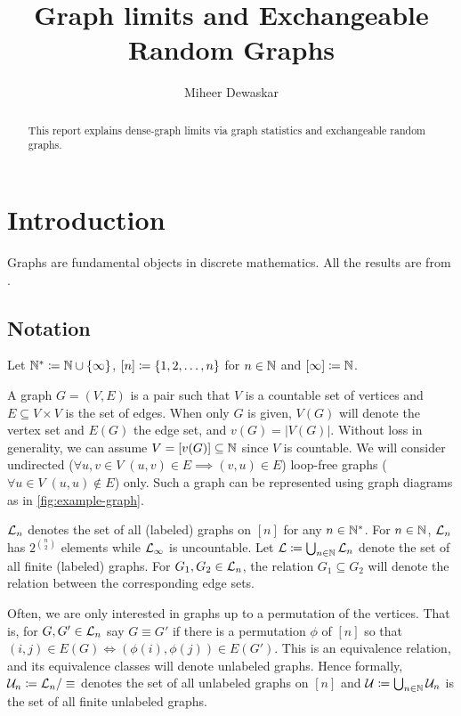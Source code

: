 \documentclass{article}
\title{Graph limits and Exchangeable Random Graphs}
\author{Miheer Dewaskar}
\begin{document}
\maketitle
\begin{abstract}
  This report explains dense-graph limits via graph statistics and exchangeable random graphs.
\end{abstract}

\section{Introduction}

Graphs are fundamental objects in discrete mathematics. 
All the results are from \cite{paper}.


\subsection{Notation}

Let $\N* \coloneqq \N \cup \set{\infty}$, $[n] \coloneqq \left\{ 1,2,\dots,n \right\}$ for $n \in \N$ and $[\infty] \coloneqq \N$.

A graph $G=(V,E)$ is a pair such that $V$ is a countable set of vertices and $E \subseteq V \times V$ is the set of edges. 
When only $G$ is given, $V(G)$ will denote the vertex set and $E(G)$ the edge set, and $v(G) = |V(G)|$. Without loss in generality, we can assume $V = [v(G)] \subseteq \N$ since $V$ is countable. We will consider undirected ($\forall u,v \in V \; (u,v) \in E \implies (v,u) \in E$) loop-free graphs ($\forall u \in V \; (u,u) \notin E$) only. Such a graph can be represented using graph diagrams as in \autoref{fig:example-graph}. 

$\Lg_{n}$ denotes the set of all (labeled) graphs on $[n]$ for any $n \in \N*$. For $n \in \N$, $\Lg_{n}$ has $2^{\binom{n}{2}}$ elements while $\Lg_{\infty}$ is uncountable. Let $\Lg \coloneqq \bigcup_{n \in \N} \Lg_{n}$ denote the set of all finite (labeled) graphs.
For $G_1, G_2 \in \Lg_{n}$, the relation $G_1 \subseteq G_2$ will denote the relation between the corresponding edge sets. 

Often, we are only interested in graphs up to a permutation of the vertices. That is, for $G, G' \in \Lg_{n}$ say $G \equiv G'$ if there is a permutation $\phi$ of $[n]$ so that $(i,j) \in E(G) \iff (\phi(i),\phi(j)) \in E(G')$. This is an equivalence relation, and its equivalence classes will denote unlabeled graphs. Hence formally, $\Ug_{n} \coloneqq \Lg_{n}/\equiv$ denotes the set of all unlabeled graphs on $[n]$ and $\Ug \coloneqq \bigcup_{n \in \N} \Ug_{n}$ is the set of all finite unlabeled graphs.
\end{document}
